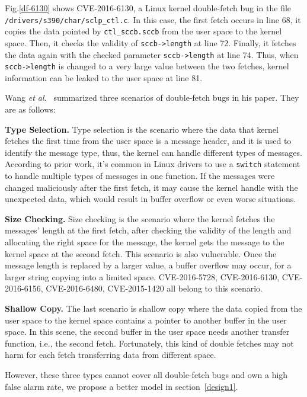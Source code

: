 \documentclass[10pt]{llncs}
\begin{document}
Fig.\ref{df-6130} shows CVE-2016-6130, a Linux kernel double-fetch bug in the file \verb:/drivers/s390/char/sclp_ctl.c:. In this case, the first fetch occurs in line 68, it copies the data pointed by \verb:ctl_sccb.sccb: from the user space to the kernel space. Then, it checks the validity of \verb:sccb->length: at line 72. Finally, it fetches the data again with the checked parameter \verb:sccb->length: at line 74. Thus, when \verb:sccb->length: is changed to a very large value between the two fetches, kernel information can be leaked to the user space at line 81.

Wang \textit{et al.}~\cite{wang} summarized three scenarios of double-fetch bugs in his paper. They are as follows:

\textbf{Type Selection.}
Type selection is the scenario where the data that kernel fetches the first time from the user space is a message header, and it is used to identify the message type, thus, the kernel can handle different types of messages. According to prior work, it's common in Linux drivers to use a \verb:switch: statement to handle multiple types of messages in one function. If the messages were changed maliciously after the first fetch, it may cause the kernel handle with the unexpected data, which would result in buffer overflow or even worse situations.

\textbf{Size Checking.}
Size checking is the scenario where the kernel fetches the messages' length at the first fetch, after checking the validity of the length and allocating the right space for the message, the kernel gets the message to the kernel space at the second fetch. This scenario is also vulnerable. Once the message length is replaced by a larger value, a buffer overflow may occur, for a larger string copying into a limited space. CVE-2016-5728, CVE-2016-6130, CVE-2016-6156, CVE-2016-6480, CVE-2015-1420 all belong to this scenario.

\textbf{Shallow Copy.}
The last scenario is shallow copy where the data copied from the user space to the kernel space contains a pointer to another buffer in the user space. In this scene, the second buffer in the user space needs another transfer function, i.e., the second fetch. Fortunately, this kind of double fetches may not harm for each fetch transferring data from different space.

However, these three types cannot cover all double-fetch bugs and own a high false alarm rate, we propose a better model in section~\ref{design1}.
\end{document}
